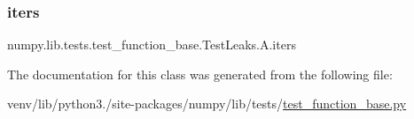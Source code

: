 \subsubsection{\texorpdfstring{iters}{iters}}
{\footnotesize\ttfamily numpy.\+lib.\+tests.\+test\+\_\+function\+\_\+base.\+Test\+Leaks.\+A.\+iters\hspace{0.3cm}{\ttfamily [static]}}



The documentation for this class was generated from the following file\+:\begin{DoxyCompactItemize}
\item 
venv/lib/python3./site-\/packages/numpy/lib/tests/\hyperlink{lib_2tests_2test__function__base_8py}{test\+\_\+function\+\_\+base.\+py}\end{DoxyCompactItemize}
